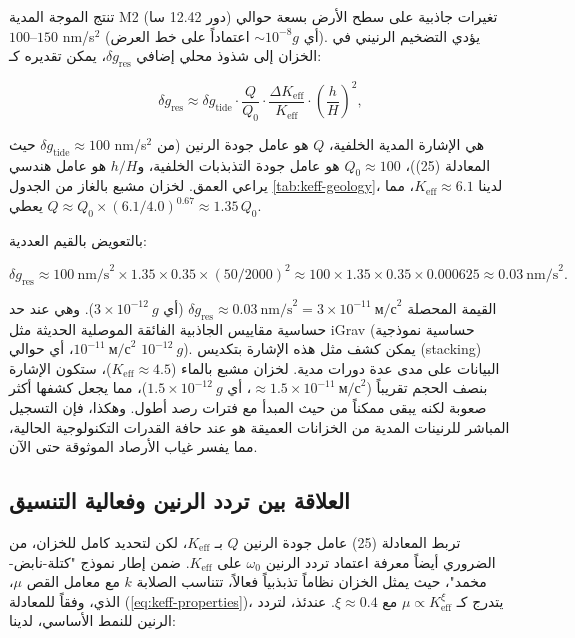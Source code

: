 \documentclass[12pt,a4paper]{article}
\newcommand{\Keff}{K_{\mathrm{eff}}}
\theoremstyle{remark}
\begin{document}
	تنتج الموجة المدية M2 (دور 12.42 سا) تغيرات جاذبية على سطح الأرض بسعة حوالي \(100\)–\(150\) nm/s\(^2\) (أي \(\sim 10^{-8} g\) اعتماداً على خط العرض). يؤدي التضخيم الرنيني في الخزان إلى شذوذ محلي إضافي \(\delta g_{\text{res}}\)، يمكن تقديره كـ:
	
	\begin{equation}
		\delta g_{\text{res}} \approx \delta g_{\text{tide}} \cdot \frac{Q}{Q_0} \cdot \frac{\Delta \Keff}{\Keff} \cdot \left(\frac{h}{H}\right)^2,
		\label{eq:signal_estimate}
	\end{equation}
	
	حيث \(\delta g_{\text{tide}} \approx 100\) nm/s\(^2\) هي الإشارة المدية الخلفية، \(Q\) هو عامل جودة الرنين (من المعادلة (25))، \(Q_0 \approx 100\) هو عامل جودة التذبذبات الخلفية، و\(h/H\) هو عامل هندسي يراعي العمق. لخزان مشبع بالغاز من الجدول \ref{tab:keff-geology}، لدينا \(\Keff \approx 6.1\)، مما يعطي \(Q \approx Q_0 \times (6.1/4.0)^{0.67} \approx 1.35\,Q_0\).
	
	بالتعويض بالقيم العددية:
	
	\[
	\delta g_{\text{res}} \approx 100\ \text{nm/s}^2 \times 1.35 \times 0.35 \times (50/2000)^2 \approx 100 \times 1.35 \times 0.35 \times 0.000625 \approx 0.03\ \text{nm/s}^2.
	\]
	
	القيمة المحصلة \(\delta g_{\text{res}} \approx 0.03\ \text{nm/s}^2 = 3 \times 10^{-11}\ \text{м/с}^2\) (أي \(3 \times 10^{-12}\ g\)). وهي عند حد حساسية مقاييس الجاذبية الفائقة الموصلية الحديثة مثل iGrav (حساسية نموذجية \(10^{-11}\ \text{м/с}^2\)، أي حوالي \(10^{-12}\ g\)). يمكن كشف مثل هذه الإشارة بتكديس (stacking) البيانات على مدى عدة دورات مدية. لخزان مشبع بالماء (\(\Keff \approx 4.5\))، ستكون الإشارة بنصف الحجم تقريباً (\( \approx 1.5\times10^{-11}\ \text{м/с}^2\)، أي \(1.5\times10^{-12}\ g\))، مما يجعل كشفها أكثر صعوبة لكنه يبقى ممكناً من حيث المبدأ مع فترات رصد أطول. وهكذا، فإن التسجيل المباشر للرنينات المدية من الخزانات العميقة هو عند حافة القدرات التكنولوجية الحالية، مما يفسر غياب الأرصاد الموثوقة حتى الآن.
	
	\subsection{العلاقة بين تردد الرنين وفعالية التنسيق}
	\label{subsec:frequency_keff}
	
	تربط المعادلة (25) عامل جودة الرنين \(Q\) بـ \(\Keff\)، لكن لتحديد كامل للخزان، من الضروري أيضاً معرفة اعتماد تردد الرنين \(\omega_0\) على \(\Keff\). ضمن إطار نموذج "كتلة-نابض-مخمد"، حيث يمثل الخزان نظاماً تذبذبياً فعالاً، تتناسب الصلابة \(k\) مع معامل القص \(\mu\)، الذي، وفقاً للمعادلة (\ref{eq:keff-properties})، يتدرج كـ \(\mu \propto \Keff^{\xi}\) مع \(\xi \approx 0.4\). عندئذ، لتردد الرنين للنمط الأساسي، لدينا:
	
\end{document}
